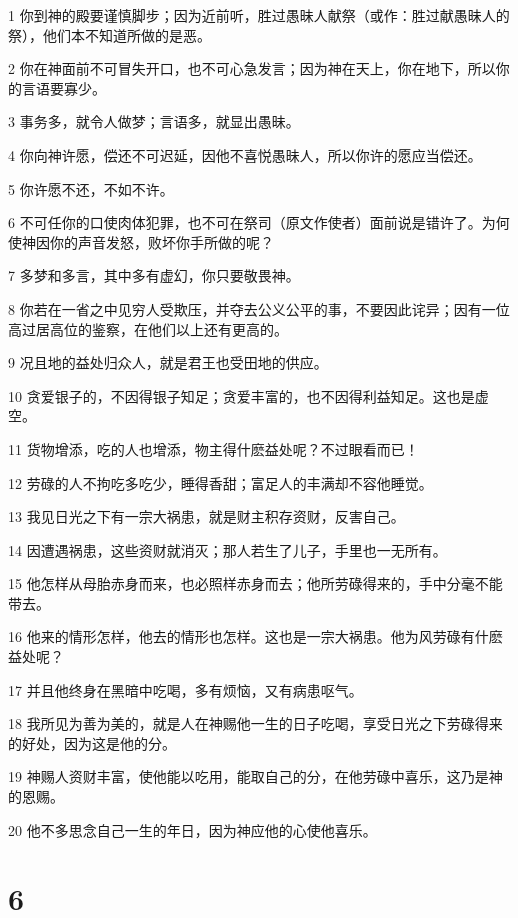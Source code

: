 \par 1 你到神的殿要谨慎脚步；因为近前听，胜过愚昧人献祭（或作：胜过献愚昧人的祭），他们本不知道所做的是恶。
\par 2 你在神面前不可冒失开口，也不可心急发言；因为神在天上，你在地下，所以你的言语要寡少。
\par 3 事务多，就令人做梦；言语多，就显出愚昧。
\par 4 你向神许愿，偿还不可迟延，因他不喜悦愚昧人，所以你许的愿应当偿还。
\par 5 你许愿不还，不如不许。
\par 6 不可任你的口使肉体犯罪，也不可在祭司（原文作使者）面前说是错许了。为何使神因你的声音发怒，败坏你手所做的呢？
\par 7 多梦和多言，其中多有虚幻，你只要敬畏神。
\par 8 你若在一省之中见穷人受欺压，并夺去公义公平的事，不要因此诧异；因有一位高过居高位的鉴察，在他们以上还有更高的。
\par 9 况且地的益处归众人，就是君王也受田地的供应。
\par 10 贪爱银子的，不因得银子知足；贪爱丰富的，也不因得利益知足。这也是虚空。
\par 11 货物增添，吃的人也增添，物主得什麽益处呢？不过眼看而已！
\par 12 劳碌的人不拘吃多吃少，睡得香甜；富足人的丰满却不容他睡觉。
\par 13 我见日光之下有一宗大祸患，就是财主积存资财，反害自己。
\par 14 因遭遇祸患，这些资财就消灭；那人若生了儿子，手里也一无所有。
\par 15 他怎样从母胎赤身而来，也必照样赤身而去；他所劳碌得来的，手中分毫不能带去。
\par 16 他来的情形怎样，他去的情形也怎样。这也是一宗大祸患。他为风劳碌有什麽益处呢？
\par 17 并且他终身在黑暗中吃喝，多有烦恼，又有病患呕气。
\par 18 我所见为善为美的，就是人在神赐他一生的日子吃喝，享受日光之下劳碌得来的好处，因为这是他的分。
\par 19 神赐人资财丰富，使他能以吃用，能取自己的分，在他劳碌中喜乐，这乃是神的恩赐。
\par 20 他不多思念自己一生的年日，因为神应他的心使他喜乐。

\chapter{6}

